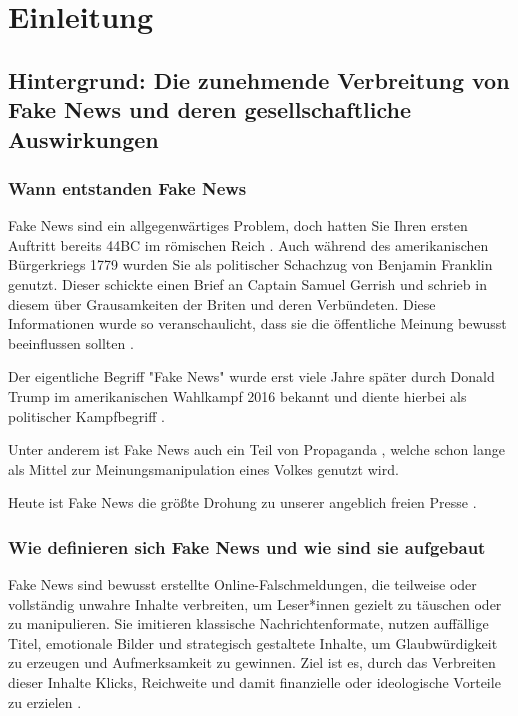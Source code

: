 \chapter{Einleitung}
\label{chap:einleitung}

\section{Hintergrund: Die zunehmende Verbreitung von Fake News und deren gesellschaftliche Auswirkungen}
\label{sec:hintergrund}


\subsection{Wann entstanden Fake News}

Fake News sind ein allgegenwärtiges Problem, doch hatten Sie Ihren ersten Auftritt bereits 44BC im römischen Reich \cite{socsci9100185}.
Auch während des amerikanischen Bürgerkriegs 1779 wurden Sie als politischer Schachzug von Benjamin Franklin genutzt.
Dieser schickte einen Brief an Captain Samuel Gerrish und schrieb in diesem über Grausamkeiten der Briten und deren Verbündeten. 
Diese Informationen wurde so veranschaulicht, dass sie die öffentliche Meinung bewusst beeinflussen sollten \cite{Sharma:2024}.

Der eigentliche Begriff "Fake News" wurde erst viele Jahre später durch Donald Trump im amerikanischen Wahlkampf 2016 bekannt \cite{Ashish2024} 
und diente hierbei als politischer Kampfbegriff \cite{buerker2022fakenews}.

Unter anderem ist Fake News auch ein Teil von Propaganda \cite{buerker2022fakenews}, welche schon lange als Mittel zur Meinungsmanipulation eines Volkes genutzt wird.

Heute ist Fake News die größte Drohung zu unserer angeblich freien Presse \cite{Sharma:2024}.

\subsection{Wie definieren sich Fake News und wie sind sie aufgebaut}
\label{sec:wie_definieren_sich_fake_news}

Fake News sind bewusst erstellte Online-Falschmeldungen, die teilweise oder vollständig unwahre Inhalte verbreiten, 
um Leser*innen gezielt zu täuschen oder zu manipulieren. Sie imitieren klassische Nachrichtenformate, nutzen auffällige Titel, emotionale Bilder und strategisch gestaltete
Inhalte, um Glaubwürdigkeit zu erzeugen und Aufmerksamkeit zu gewinnen. Ziel ist es, durch das Verbreiten dieser Inhalte Klicks, Reichweite und damit finanzielle oder ideologische Vorteile zu
erzielen \cite{socsci9100185}.

